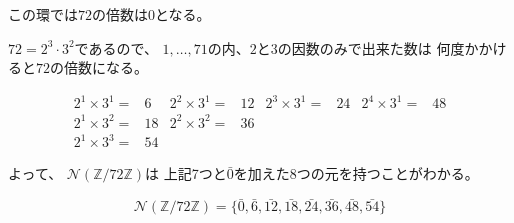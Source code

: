 \documentclass[12pt,b5paper]{ltjsarticle}
\begin{document}
\begin{enumerate}
\begin{enumerate}
            この環では$72$の倍数は$0$となる。

            $72 = 2^{3}\cdot 3^{2}$であるので、
            $1,\dots,71$の内、$2$と$3$の因数のみで出来た数は
            何度かかけると$72$の倍数になる。

            \begin{align}
             2^{1} \times 3^{1} =& 6 &
             2^{2} \times 3^{1} =& 12 &
             2^{3} \times 3^{1} =& 24 &
             2^{4} \times 3^{1} =& 48 \\
             2^{1} \times 3^{2} =& 18 &
             2^{2} \times 3^{2} =& 36 \\
             2^{1} \times 3^{3} =& 54
            \end{align}

            よって、
            $\mathcal{N}(\mathbb{Z}/72\mathbb{Z})$は
            上記7つと$\bar{0}$を加えた8つの元を持つことがわかる。

            \begin{equation}
             \mathcal{N}(\mathbb{Z}/72\mathbb{Z})
              =\{
              \bar{0},
              \bar{6},\bar{12},
              \bar{18},\bar{24},
              \bar{36},\bar{48},
              \bar{54}
              \}
            \end{equation}


            \hrulefill

      \end{enumerate}
\end{enumerate}

\hrulefill
\end{document}
